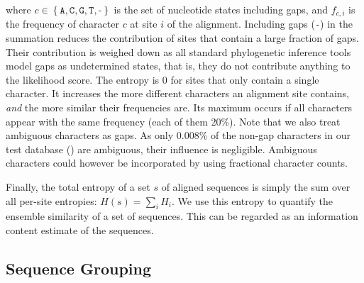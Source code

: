 where $c \in \left\{ \texttt{A}, \texttt{C}, \texttt{G}, \texttt{T}, \texttt{-} \right\}$ is the set of nucleotide states
including gaps, and $ f_{c,i} $ is the frequency of character $c$ at site $i$ of the alignment.
Including gaps (\texttt{-}) in the summation reduces the contribution of sites that contain a large fraction of gaps.
Their contribution is weighed down as all standard phylogenetic inference tools model gaps as undetermined states,
that is, they do not contribute anything to the likelihood score.
The entropy is \num{0} for sites that only contain a single character.
It increases the more different characters an alignment site contains, {\em and} the more similar their frequencies are.
Its maximum occurs if all characters appear with the same frequency (each of them \num{20}\%).
Note that we also treat ambiguous characters as gaps.
As only \num{0.008}\% of the non-gap characters in our test database () are ambiguous,
their influence is negligible.
Ambiguous characters could however be incorporated by using fractional character counts.

Finally, the total entropy of a set $s$ of aligned sequences is simply the sum over all per-site entropies:
$H(s) = \sum_i H_i$.
We use this entropy to quantify the ensemble similarity of a set of sequences.
This can be regarded as an information content estimate of the sequences.


\subsection{Sequence Grouping}
\label{ch:AutomaticTrees:sec:Method:sub:SequenceGrouping}

